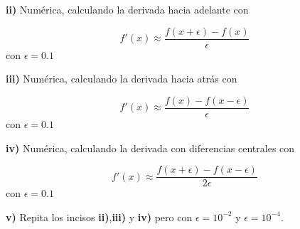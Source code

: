 \documentclass{article} %
\begin{document}
\textbf{ii)} Numérica, calculando la derivada hacia adelante con

\begin{equation*}
    f'(x) \approx \frac{f(x+\epsilon) - f(x)}{\epsilon}
\end{equation*}
con $\epsilon = 0.1$

\textbf{iii)} Numérica, calculando la derivada hacia atrás con

\begin{equation*}
    f'(x) \approx \frac{f(x) - f(x-\epsilon)}{\epsilon}
\end{equation*}
con $\epsilon = 0.1$

\textbf{iv)} Numérica, calculando la derivada con diferencias centrales con

\begin{equation*}
    f'(x) \approx \frac{f(x+\epsilon) - f(x-\epsilon)}{2\epsilon}
\end{equation*}
con $\epsilon = 0.1$

\textbf{v)} Repita los incisos \textbf{ii)},\textbf{iii)} y \textbf{iv)} pero con $\epsilon = 10^{-2}$ y $\epsilon = 10^{-4}$.
\end{document}
